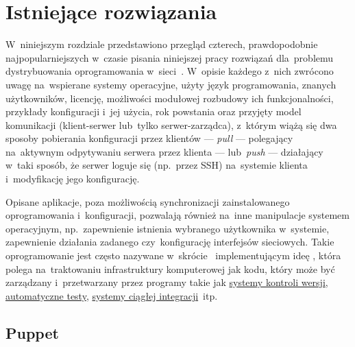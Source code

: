 \documentclass[thesis]{subfiles}
\begin{document}

\chapter{Istniejące rozwiązania}
\label{ch:istniejace-rozwiazania}

W~niniejszym rozdziale przedstawiono przegląd czterech, prawdopodobnie najpopularniejszych w~czasie pisania niniejszej pracy rozwiązań dla~problemu dystrybuowania oprogramowania w~sieci~\cite{leading-scms}. W~opisie każdego z~nich zwrócono uwagę na~wspierane systemy operacyjne, użyty język programowania, znanych użytkowników, licencję, możliwości modułowej rozbudowy ich funkcjonalności, przykłady konfiguracji i~jej użycia, rok powstania oraz przyjęty model komunikacji (klient-serwer lub~tylko serwer-zarządca), z~którym wiążą się dwa sposoby pobierania konfiguracji przez klientów --- \emph{pull} --- polegający na~aktywnym odpytywaniu serwera przez klienta --- lub~\emph{push} --- działający w~taki sposób, że serwer loguje się (np.~przez SSH) na~systemie klienta i~modyfikację jego konfigurację.

Opisane aplikacje, poza możliwością synchronizacji zainstalowanego oprogramowania i~konfiguracji, pozwalają również na~inne manipulacje systemem operacyjnym, np.~zapewnienie istnienia wybranego użytkownika w~systemie, zapewnienie działania zadanego  czy~konfigurację interfejsów sieciowych. Takie oprogramowanie jest często nazywane w~skrócie~ implementującym ideę , która polega na~traktowaniu infrastruktury komputerowej jak kodu, który może być zarządzany i~przetwarzany przez programy takie jak \href{https://en.wikipedia.org/wiki/Version_control}{systemy kontroli wersji}, \href{https://en.wikipedia.org/wiki/Test_automation}{automatyczne testy}, \href{https://en.wikipedia.org/wiki/Comparison_of_continuous_integration_software}{systemy ciągłej integracji}~itp.~\cite{puppet-iac}


\section{Puppet}
\label{sec:puppet}
\end{document}
